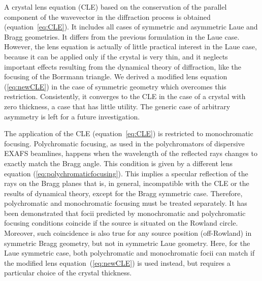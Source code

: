 \documentclass[preprint]{iucr}              %
\begin{document}
A crystal lens equation (CLE) based on the conservation of the parallel component of the wavevector in the diffraction process is obtained (equation~\ref{eq:CLE}). It includes all cases of symmetric and asymmetric Laue and Bragg geometries. It differs from the previous formulation \cite{CK} in the Laue case. However, the lens equation is actually of little practical interest in the Laue case, because it can be applied only if the crystal is very thin, and it neglects important effects resulting from the dynamical theory of diffraction, like the focusing of the Borrmann triangle. We derived a modified lens equation (\ref{eq:newCLE}) in the case of symmetric geometry which overcomes this restriction. Consistently, it converges to the CLE in the case of a crystal with zero thickness, a case that has little utility. The generic case of arbitrary asymmetry is left for a future investigation.

The application of the CLE (equation~\ref{eq:CLE}) is restricted to monochromatic focusing. Polychromatic focusing, as used in the polychromators of dispersive EXAFS beamlines, happens when the wavelength of the reflected rays changes to exactly match the Bragg angle. This condition is given by a different lens equation (\ref{eq:polychromaticfocusing}). This implies a specular reflection of the rays on the Bragg planes that is, in general, incompatible with the CLE or the results of dynamical theory, except for the Bragg symmetric case. Therefore, polychromatic and monochromatic focusing must be treated separately. It has been demonstrated that focii predicted by monochromatic and polychromatic focusing conditions coincide if the source is situated on the Rowland circle. Moreover, such coincidence is also true for any source position (off-Rowland) in symmetric Bragg geometry, but not in symmetric Laue geometry. Here, for the Laue symmetric case, both polychromatic and monochromatic focii can match if the modified lens equation~(\ref{eq:newCLE}) is used instead, but requires a particular choice of the crystal thickness.



\end{document}
